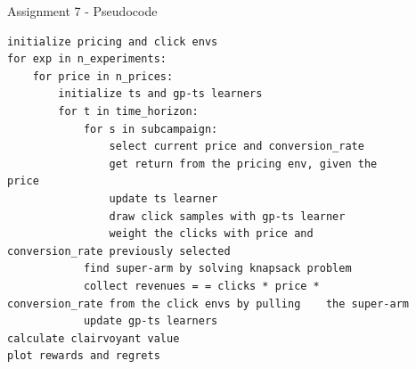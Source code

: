 \documentclass[11pt]{beamer}
\begin{document}
\begin{frame}[fragile]{Assignment 7 - Pseudocode}
\begin{lstlisting}
initialize pricing and click envs
for exp in n_experiments:
	for price in n_prices:
		initialize ts and gp-ts learners 
		for t in time_horizon:
			for s in subcampaign:
				select current price and conversion_rate 
				get return from the pricing env, given the				price
				update ts learner
				draw click samples with gp-ts learner
				weight the clicks with price and                   conversion_rate previously selected
			find super-arm by solving knapsack problem
			collect revenues = = clicks * price *             conversion_rate from the click envs by pulling    the super-arm
			update gp-ts learners 
calculate clairvoyant value
plot rewards and regrets
\end{lstlisting}
\end{frame}
\end{document}
